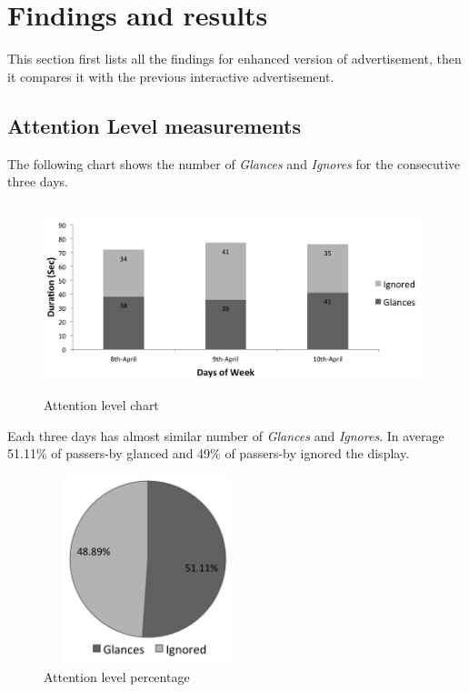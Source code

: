 \begin{enumerate}
\end{enumerate}

\section{Findings and results}
This section first lists all the findings for enhanced version of advertisement, then it compares it with the previous interactive advertisement.


\subsection{Attention Level measurements}
The following chart shows the number of \emph{Glances} and \emph{Ignores} for the consecutive three days.

\begin{figure}[H]
    \centering
    \includegraphics[width=110mm,height=55mm]{Figures/9/newbody_Inter_chart}%
    \caption{Attention level chart}%
    \label{fig:newbodyattentionlevelchart}%
\end{figure}


Each three days has almost similar number of \emph{Glances} and \emph{Ignores}. In average 51.11\% of passers-by glanced and 49\% of passers-by ignored the display.

\begin{figure}[H]
    \centering
    \includegraphics[width=60mm,height=55mm]{Figures/9/newbody_inter_percentage}
    \caption{Attention level percentage}%
    \label{fig:Nonattentionlevelpercentage}%
\end{figure}



